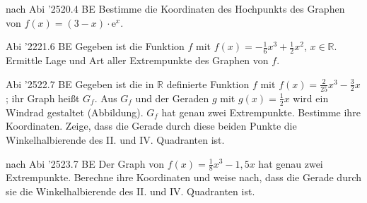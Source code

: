 \documentclass[11pt]{article}
\begin{document}
\pfgruppe{}
\begin{pfaufg}{nach Abi ’25}{20.}{4 BE}
Bestimme die Koordinaten des Hochpunkts des Graphen von $f(x) = (3 - x) \cdot \mathrm{e}^{x}$.
\end{pfaufg}
\pfgruppe{}
\begin{pfaufg}{Abi ’22}{21.}{6 BE}
Gegeben ist die Funktion $f$ mit $f(x) = -\tfrac{1}{6}x^3 + \tfrac{1}{2}x^2$, $x \in \mathbb{R}$. Ermittle Lage und Art aller Extrempunkte des Graphen von $f$.
\end{pfaufg}
\begin{pfaufg}{Abi ’25}{22.}{7 BE}
Gegeben ist die in $\mathbb{R}$ definierte Funktion $f$ mit $f(x) = \tfrac{2}{25}x^3 - \tfrac{3}{2}x$; ihr Graph heißt $G_f$. Aus $G_f$ und der Geraden $g$ mit $g(x) = \tfrac{1}{2}x$ wird ein Windrad gestaltet (Abbildung). $G_f$ hat genau zwei Extrempunkte. Bestimme ihre Koordinaten. Zeige, dass die Gerade durch diese beiden Punkte die Winkelhalbierende des II. und IV. Quadranten ist.
\par\smallskip\noindent {}\par
{}
\end{pfaufg}
\pfgruppe{}
\begin{pfaufg}{nach Abi ’25}{23.}{7 BE}
Der Graph von $f(x) = \tfrac{1}{8}x^3 - 1{,}5x$ hat genau zwei Extrempunkte. Berechne ihre Koordinaten und weise nach, dass die Gerade durch sie die Winkelhalbierende des II. und IV. Quadranten ist.
\end{pfaufg}
\end{document}
